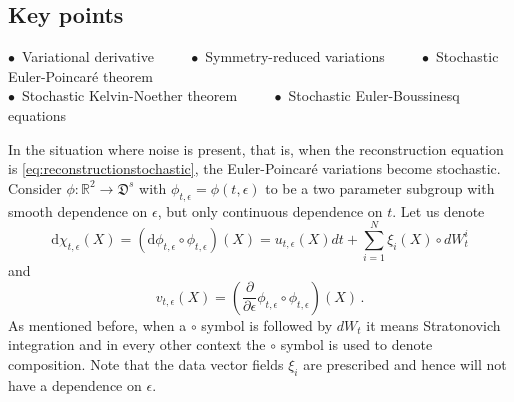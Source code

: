 \documentclass[11pt, oneside]{article}   	%
\numberwithin{equation}{section}
\theoremstyle{plain}
\theoremstyle{definition}
\theoremstyle{remark}
\newcommand{\<}{\langle}
\renewcommand{\>}{\rangle}
\def\rmd{{\mathrm{d}}}
\begin{document}
\subsection*{Key points}
\begin{center}
    $\bullet\,$ Variational derivative $\qquad$ 
    $\bullet\,$ Symmetry-reduced variations $\qquad$ 
    $\bullet\,$ Stochastic Euler-Poincar\'e theorem $\qquad$ \\  
      
    $\bullet\,$ Stochastic Kelvin-Noether theorem $\qquad$  
    $\bullet\,$ Stochastic Euler-Boussinesq equations 
\end{center}
In the situation where noise is present, that is, when the reconstruction equation is  \eqref{eq:reconstructionstochastic}, the Euler-Poincar\'e variations become stochastic. Consider $\phi:\mathbb{R}^2\to\mathfrak{D}^s$ with $\phi_{t,\epsilon}=\phi(t,\epsilon)$ to be a two parameter subgroup with smooth dependence on $\epsilon$, but only continuous dependence on $t$. Let us denote 
\[
{\rmd}\chi_{t,\epsilon}(X) = ({\rmd}\phi_{t,\epsilon}\circ \phi_{t,\epsilon})(X) = u_{t,\epsilon}(X)dt + \sum_{i=1}^N \xi_i(X)\circ dW_t^i
\]
 and  
 \[
 v_{t,\epsilon}(X) = (\frac{\partial}{\partial \epsilon}\phi_{t,\epsilon}\circ \phi_{t,\epsilon})(X)\,.
 \] 
As mentioned before, when a $\circ$ symbol is followed by $dW_t$ it means Stratonovich integration and in every other context the $\circ$ symbol is used to denote composition. Note that the data vector fields $\xi_i$ are prescribed and hence will not have a dependence on $\epsilon$. 
 
\end{document}
